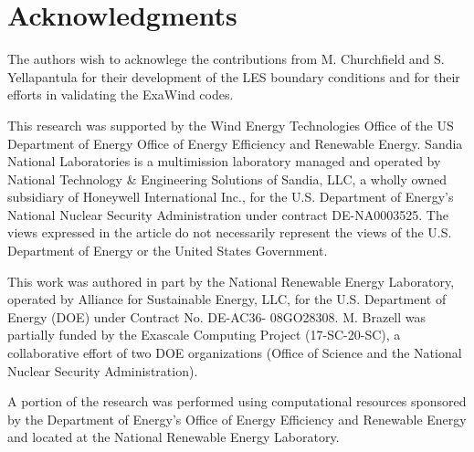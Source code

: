\documentclass[conf]{new-aiaa}
\begin{document}


\section*{Acknowledgments}

The authors wish to acknowlege the contributions from M. Churchfield
and S. Yellapantula for their development of the LES boundary
conditions and for their efforts in validating the ExaWind codes.

This research was supported by the Wind Energy Technologies Office of
the US Department of Energy Office of Energy Efficiency and Renewable
Energy.  Sandia National Laboratories is a multimission laboratory
managed and operated by National Technology \& Engineering Solutions
of Sandia, LLC, a wholly owned subsidiary of Honeywell International
Inc., for the U.S. Department of Energy's National Nuclear Security
Administration under contract DE-NA0003525. The views expressed in the
article do not necessarily represent the views of the U.S. Department
of Energy or the United States Government.

This work was authored in part by the National Renewable Energy
Laboratory, operated by Alliance for Sustainable Energy, LLC, for the
U.S. Department of Energy (DOE) under Contract No. DE-AC36-
08GO28308. M. Brazell was partially funded by the Exascale Computing
Project (17-SC-20-SC), a collaborative effort of two DOE organizations
(Office of Science and the National Nuclear Security Administration).

A portion of the research was performed using computational
resources sponsored by the Department of Energy's Office of Energy
Efficiency and Renewable Energy and located at the National Renewable
Energy Laboratory.


\end{document}
